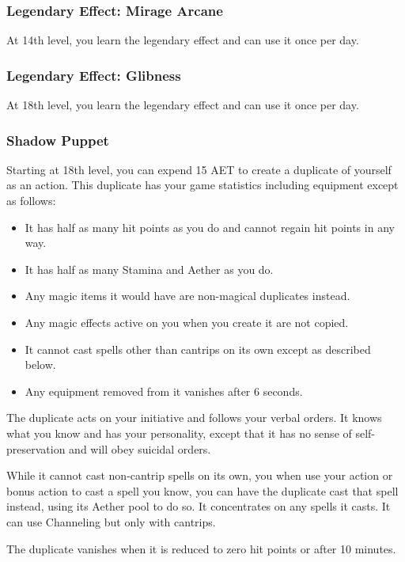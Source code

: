 \subsubsection{Legendary Effect: Mirage Arcane}
At 14th level, you learn the legendary effect  and can use it once per day.

\subsubsection{Legendary Effect: Glibness}
At 18th level, you learn the legendary effect  and can use it once per day.

\subsubsection{Shadow Puppet}
Starting at 18th level, you can expend 15 AET to create a duplicate of yourself as an action. This duplicate has your game statistics including equipment except as follows:
\begin{itemize}
    \item It has half as many hit points as you do and cannot regain hit points in any way.
    \item It has half as many Stamina and Aether as you do.
    \item Any magic items it would have are non-magical duplicates instead.
    \item Any magic effects active on you when you create it are not copied.
    \item It cannot cast spells other than cantrips on its own except as described below.
    \item Any equipment removed from it vanishes after 6 seconds.
\end{itemize}

The duplicate acts on your initiative and follows your verbal orders. It knows what you know and has your personality, except that it has no sense of self-preservation and will obey suicidal orders.

While it cannot cast non-cantrip spells on its own, you when use your action or bonus action to cast a spell you know, you can have the duplicate cast that spell instead, using its Aether pool to do so. It concentrates on any spells it casts. It can use Channeling but only with cantrips.

The duplicate vanishes when it is reduced to zero hit points or after 10 minutes.

